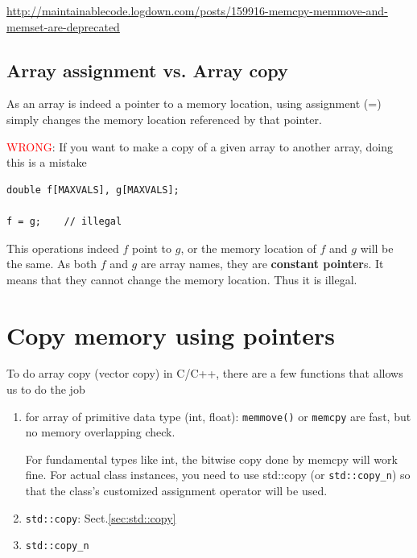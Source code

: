 \url{http://maintainablecode.logdown.com/posts/159916-memcpy-memmove-and-memset-are-deprecated}
\subsection{Array assignment vs. Array copy}
\label{sec:array-assignment}

As an array is indeed a pointer to a memory location, using assignment (=)
simply changes the memory location referenced by that pointer.

\textcolor{red}{WRONG}: If you want to make a copy of a given array to another
array, doing this is a mistake
\begin{lstlisting}
double f[MAXVALS], g[MAXVALS];

f = g;    // illegal
\end{lstlisting}
This operations indeed $f$ point to $g$, or the memory location of $f$
and $g$ will be the same.  As both $f$ and $g$ are array names, they
are {\bf constant pointer}s. It means that they cannot change the
memory location. Thus it is illegal.

\section{Copy memory using pointers}
\label{sec:array-copy}

To do array copy (vector copy) in C/C++,  there are a few functions that allows
us to do the job
\begin{enumerate}
  \item for array of primitive data type (int, float): \verb!memmove()! or
  \verb!memcpy! are fast, but no memory overlapping check.
  
  For fundamental types like int, the bitwise copy done by memcpy will work
  fine. For actual class instances, you need to use std::copy (or \verb!std::copy_n!) so
  that the class's customized assignment operator will be used.
  
  \item \verb!std::copy!: Sect.\ref{sec:std::copy}
 
  \item \verb!std::copy_n!
\end{enumerate}


